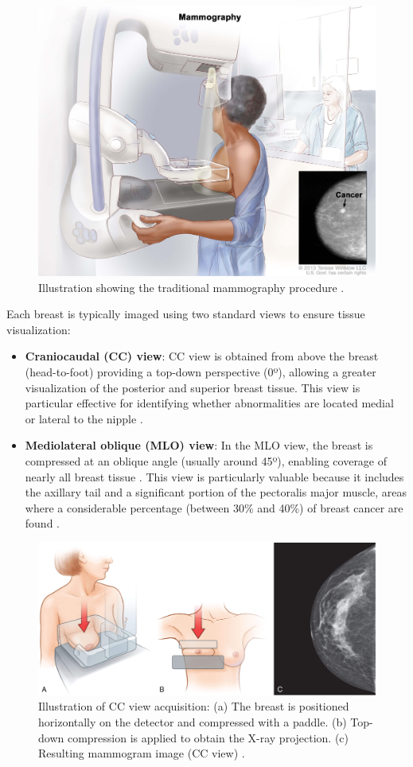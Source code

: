 \documentclass[a4paper,10pt]{book}
\begin{document}
\begin{figure}[h!]
    \centering
    \includegraphics[width=0.45\linewidth]{reports//assets/mammography.jpg}
    \caption[Traditional mammography procedure]{Illustration showing the traditional mammography procedure \cite{nihDefinitionMammogramNCI2011}.}
    \label{fig:mammography}
\end{figure}


Each breast is typically imaged using two standard views to ensure tissue visualization:

\begin{itemize}
    \item \textbf{Craniocaudal (CC) view}: CC view is obtained from above the breast (head-to-foot) providing a top-down perspective (0º), allowing a greater visualization of the posterior and superior breast tissue. This view is particular effective for identifying whether abnormalities are located medial or lateral to the nipple \cite{noauthor_guide_nodate}.
    \item \textbf{Mediolateral oblique (MLO) view}: In the MLO view, the breast is compressed at an oblique angle (usually around 45º), enabling coverage of nearly all breast tissue \cite{noauthor_guide_nodate}. This view is particularly valuable because it includes the axillary tail and a significant portion of the pectoralis major muscle, areas where a considerable percentage (between 30\% and 40\%) of breast cancer are found \cite{aljarrah_trends_2014, noauthor_breast_2015}.
\end{itemize}



\begin{figure}[h!]
    \centering
    \includegraphics[width=0.6\linewidth]{reports//assets/cc_view.jpg}
    \caption[CC view acquisition procedure]{Illustration of CC view acquisition: (a) The breast is positioned horizontally on the detector and compressed with a paddle. (b) Top-down compression is applied to obtain the X-ray projection. 
    (c) Resulting mammogram image (CC view) \cite{imaging_introduction_2022}. }
    \label{fig:cc_view}
\end{figure}
\end{document}
